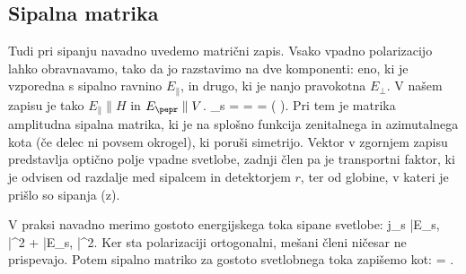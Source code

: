 \subsection*{Sipalna matrika}
Tudi pri sipanju navadno uvedemo matrični zapis. Vsako vpadno polarizacijo lahko obravnavamo, tako
da jo razstavimo na dve komponenti: eno, ki je vzporedna s sipalno ravnino $E_\parallel$, in drugo, ki 
je nanjo pravokotna $E_\perp$. V našem zapisu je tako $E_\parallel \parallel H$ in
$E_\pepr \parallel V$. 
\beq
{}_s = 
\left[\begin{array}{c}
E_{s,H}\\
E_{s,V}\\
\end{array}\right]
=  = 
\left[\begin{array}{cc}
S_2 & S_3 \\
S_4 & S_1\\
\end{array}\right] 
\left(
\right)\!\!.
\label{eq:07_14}
\eeq
Pri tem je matrika amplitudna sipalna matrika, ki je na splošno funkcija zenitalnega
in azimutalnega kota (če delec ni povsem okrogel), ki poruši simetrijo. Vektor v zgornjem
zapisu predstavlja optično polje vpadne svetlobe, zadnji člen pa je transportni faktor,
ki je odvisen od razdalje med sipalcem in detektorjem $r$, ter od globine, v kateri
je prišlo so sipanja (z).

V praksi navadno merimo gostoto energijskega toka sipane svetlobe:
\beq
j_s \propto |E_{s, \parallel}|^2 + |E_{s, \perp}|^2.
\label{eq:07_15}
\eeq
Ker sta polarizaciji ortogonalni, mešani členi ničesar ne prispevajo. Potem sipalno matriko
za gostoto svetlobnega toka zapišemo kot:
\beq
{} = 
\left[\begin{array}{cc}
|S_2|^2& 0\\
0 & |S_1|^2\\
\end{array}\right] 
\!\!.
\label{eq:07_16}
\eeq

